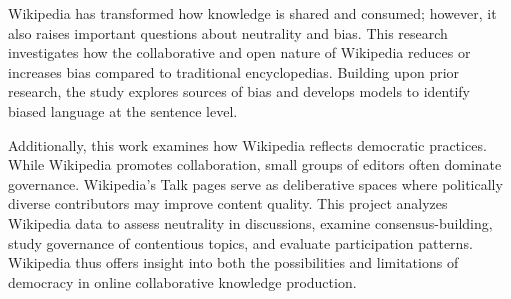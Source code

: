
Wikipedia has transformed how knowledge is shared and consumed; however, it also raises important questions about neutrality and bias. This research investigates how the collaborative and open nature of Wikipedia reduces or increases bias compared to traditional encyclopedias. Building upon prior research, the study explores sources of bias and develops models to identify biased language at the sentence level.

Additionally, this work examines how Wikipedia reflects democratic practices. While Wikipedia promotes collaboration, small groups of editors often dominate governance. Wikipedia’s Talk pages serve as deliberative spaces where politically diverse contributors may improve content quality. This project analyzes Wikipedia data to assess neutrality in discussions, examine consensus-building, study governance of contentious topics, and evaluate participation patterns. Wikipedia thus offers insight into both the possibilities and limitations of democracy in online collaborative knowledge production.

